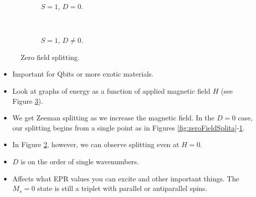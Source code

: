 \documentclass[../notes.tex]{subfiles}
\begin{document}
\begin{itemize}
\begin{figure}[h!]
\begin{subfigure}[b]{0.49\linewidth}
            \caption{$S=1$, $D=0$.}
            \label{fig:zeroFieldSplitb}
        \end{subfigure}\\[1em]
        \begin{subfigure}[b]{0.49\linewidth}
            \centering
            \caption{$S=1$, $D\neq 0$.}
            \label{fig:zeroFieldSplitc}
        \end{subfigure}
        \caption{Zero field splitting.}
        \label{fig:zeroFieldSplit}
    \end{figure}
    \begin{itemize}
        \item Important for Qbits or more exotic materials.
        \item Look at graphs of energy as a function of applied magnetic field $H$ (see Figure \ref{fig:zeroFieldSplit}).
        \item We get Zeeman splitting as we increase the magnetic field. In the $D=0$ case, our splitting begins from a single point as in Figures \ref{fig:zeroFieldSplita}-\ref{fig:zeroFieldSplitb}.
        \item In Figure \ref{fig:zeroFieldSplitc}, however, we can observe splitting even at $H=0$.
        \item $D$ is on the order of single wavenumbers.
        \item Affects what EPR values you can excite and other important things. The $M_s=0$ state is still a triplet with parallel or antiparallel spins.
    \end{itemize}
\end{itemize}
\end{document}
